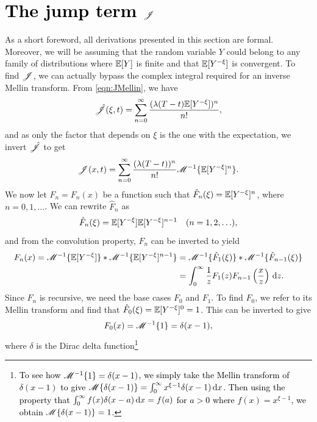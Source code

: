 \section{\textcolor{black}{The jump term $\mathscr J$}}
As a short foreword, all derivations presented in this section are formal. Moreover, we will be assuming that the random variable $Y$ could belong to any family of distributions where $\mathbb E[Y]$ is finite and that $\mathbb E[Y^{-\xi}]$ is convergent. To find $\mathscr J$, we can actually bypass the complex integral required for an inverse Mellin transform. From \eqref{eqn:JMellin}, we have
	\begin{align*}
		\hat {\mathscr J}(\xi,t) = \displaystyle\sum\limits_{n=0}^{\infty} \frac{(\lambda(T-t)\mathbb E[Y^{-\xi}])^n}{n!},
	\end{align*}
and as only the factor that depends on $\xi$ is the one with the expectation, we invert $\hat {\mathscr J}$ to get
	\begin{equation}
		\label{eqn:Jhat}
		\mathscr J(x,t) = \displaystyle\sum\limits_{n=0}^{\infty} \frac{(\lambda(T-t))^n}{n!}\mathscr M^{-1}\{ \mathbb E[Y^{-\xi}]^n \}.
	\end{equation}
We now let $F_n = F_n(x)$ be a function such that $\hat F_n(\xi) = \mathbb E[Y^{-\xi}]^n$, where $ n = 0, 1, \ldots$. We can rewrite $\hat F_n$ as
	\begin{equation*}
		\hat F_n(\xi) = \mathbb E[Y^{-\xi}] \mathbb E[Y^{-\xi}]^{n-1} \quad (n = 1,2,\ldots),
	\end{equation*}
and from the convolution property, $\hat F_n$ can be inverted to yield
	\begin{align*}
		F_n(x) = \mathscr M^{-1} \{ \mathbb E[Y^{-\xi}] \} \ast \mathscr M^{-1} \{ \mathbb E[Y^{-\xi}]^{n-1} \} &= \mathscr M^{-1}\{ \hat F_1(\xi) \} \ast \mathscr M^{-1}\{ \hat F_{n-1}(\xi) \} \\
		&= \int_0^\infty \frac{1}{z} F_1(z)F_{n-1}\left( \frac{x}{z} \right) \, \mathrm d z.
	\end{align*}
Since $F_n$ is recursive, we need the base cases $F_0$ and $F_1$. To find $F_0$, we refer to its Mellin transform and find that $\hat F_0(\xi) = \mathbb E[Y^{-\xi}]^0 = 1$. This can be inverted to give
	\begin{equation*}
		F_0(x) = \mathscr M^{-1}\{ 1 \} = \delta(x-1),
	\end{equation*}
where $\delta$ is the Dirac delta function\footnote{\textcolor{black}{To see how $\mathscr M^{-1}\{1\} = \delta(x-1)$, we simply take the Mellin transform of $\delta(x-1)$ to give $\mathscr M\{\delta(x-1)\} = \int_0^\infty x^{\xi-1}\delta(x-1) \, \mathrm d x$. Then using the property that $\int_0^\infty f(x)\delta(x-a) \, \mathrm d x = f(a)$ for $a > 0$ where $f(x) = x^{\xi-1}$, we obtain $\mathscr M\{\delta(x-1)\} = 1$.}}
